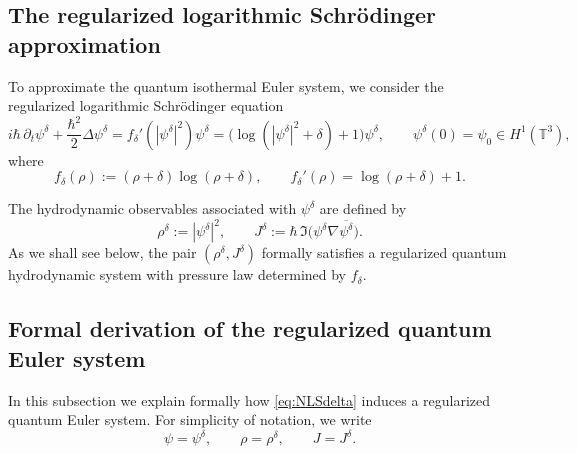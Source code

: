 \documentclass[11pt]{article}
\begin{document}
\subsection{The regularized logarithmic Schr\"odinger approximation}
\label{subsec:reg-logNLS}

To approximate the quantum isothermal Euler system, we consider the regularized logarithmic Schr\"odinger equation
\begin{equation}\label{eq:NLSdelta}
i\hbar\,\partial_t\psi^\delta + \frac{\hbar^2}{2}\Delta\psi^\delta
=
f_\delta'(|\psi^\delta|^2)\psi^\delta
=
\bigl(\log(|\psi^\delta|^2+\delta)+1\bigr)\psi^\delta,
\qquad
\psi^\delta(0)=\psi_0\in H^1(\mathbb{T}^3),
\end{equation}
where
\begin{equation}\label{eq:fdelta-def}
f_\delta(\rho):=(\rho+\delta)\log(\rho+\delta),
\qquad
f_\delta'(\rho)=\log(\rho+\delta)+1.
\end{equation}

The hydrodynamic observables associated with \(\psi^\delta\) are defined by
\begin{equation}\label{eq:rhoJ}
\rho^\delta:=|\psi^\delta|^2,
\qquad
J^\delta:=\hbar\,\Im\!\bigl(\psi^\delta\nabla\overline{\psi^\delta}\bigr).
\end{equation}
As we shall see below, the pair \((\rho^\delta,J^\delta)\) formally satisfies a regularized quantum hydrodynamic system with pressure law determined by \(f_\delta\).  


\subsection{Formal derivation of the regularized quantum Euler system}
\label{subsec:formal-QE}

In this subsection we explain formally how \eqref{eq:NLSdelta} induces a regularized quantum Euler system. For simplicity of notation, we write
\[
\psi=\psi^\delta,
\qquad
\rho=\rho^\delta,
\qquad
J=J^\delta.
\]
\end{document}
